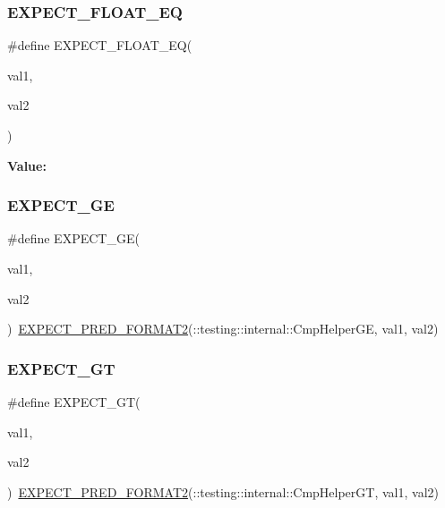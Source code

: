 \subsubsection{\texorpdfstring{EXPECT\_FLOAT\_EQ}{EXPECT\_FLOAT\_EQ}}
{\footnotesize\ttfamily \#define E\+X\+P\+E\+C\+T\+\_\+\+F\+L\+O\+A\+T\+\_\+\+EQ(\begin{DoxyParamCaption}\item[{}]{val1,  }\item[{}]{val2 }\end{DoxyParamCaption})}

{\bfseries Value\+:}
\begin{DoxyCode}{0}

\end{DoxyCode}
\mbox{\label{_obj__test_2lib_2googletest-master_2googletest_2include_2gtest_2gtest_8h_ab7a0ff4bfa4d9b27baa118d8b0756ca0}} 
\subsubsection{\texorpdfstring{EXPECT\_GE}{EXPECT\_GE}}
{\footnotesize\ttfamily \#define E\+X\+P\+E\+C\+T\+\_\+\+GE(\begin{DoxyParamCaption}\item[{}]{val1,  }\item[{}]{val2 }\end{DoxyParamCaption})~\mbox{\hyperlink{_obj__test_2lib_2googletest-release-1_88_81_2googletest_2include_2gtest_2gtest__pred__impl_8h_af0141918615a5e2d5247e9cda8324dae}{E\+X\+P\+E\+C\+T\+\_\+\+P\+R\+E\+D\+\_\+\+F\+O\+R\+M\+A\+T2}}(\+::testing\+::internal\+::\+Cmp\+Helper\+GE, val1, val2)}

\mbox{\label{_obj__test_2lib_2googletest-master_2googletest_2include_2gtest_2gtest_8h_aa8bc8320813e1abb0016129b636e3b27}} 
\subsubsection{\texorpdfstring{EXPECT\_GT}{EXPECT\_GT}}
{\footnotesize\ttfamily \#define E\+X\+P\+E\+C\+T\+\_\+\+GT(\begin{DoxyParamCaption}\item[{}]{val1,  }\item[{}]{val2 }\end{DoxyParamCaption})~\mbox{\hyperlink{_obj__test_2lib_2googletest-release-1_88_81_2googletest_2include_2gtest_2gtest__pred__impl_8h_af0141918615a5e2d5247e9cda8324dae}{E\+X\+P\+E\+C\+T\+\_\+\+P\+R\+E\+D\+\_\+\+F\+O\+R\+M\+A\+T2}}(\+::testing\+::internal\+::\+Cmp\+Helper\+GT, val1, val2)}

